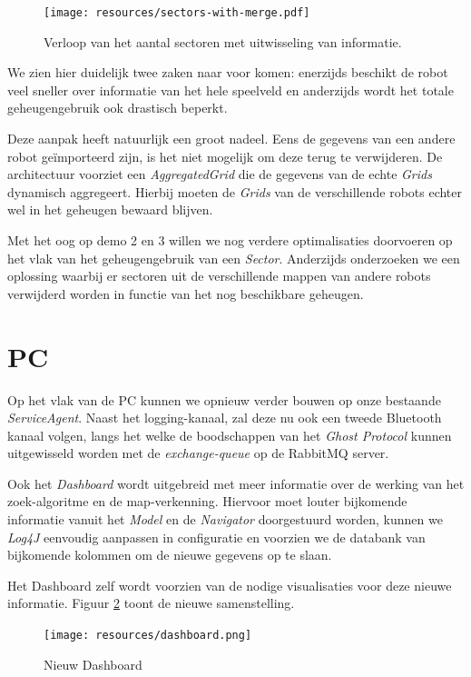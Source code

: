 \documentclass[12pt,a4paper]{report}
\begin{document}
\begin{figure}[htbp]
  \centering
  \texttt{[image: resources/sectors-with-merge.pdf]}
  \caption{Verloop van het aantal sectoren met uitwisseling van informatie.}
  \label{chart:sectors-with-merge}
\end{figure}

We zien hier duidelijk twee zaken naar voor komen: enerzijds beschikt de robot veel sneller over informatie van het hele speelveld en anderzijds wordt het totale geheugengebruik ook drastisch beperkt.

Deze aanpak heeft natuurlijk een groot nadeel. Eens de gegevens van een andere robot ge\"importeerd zijn, is het niet mogelijk om deze terug te verwijderen. De architectuur voorziet een \emph{AggregatedGrid} die de gegevens van de echte \emph{Grids} dynamisch aggregeert. Hierbij moeten de \emph{Grids}  van de verschillende robots echter wel in het geheugen bewaard blijven.

Met het oog op demo 2 en 3 willen we nog verdere optimalisaties doorvoeren op het vlak van het geheugengebruik van een \emph{Sector}. Anderzijds onderzoeken we een oplossing waarbij er sectoren uit de verschillende mappen van andere robots verwijderd worden in functie van het nog beschikbare geheugen.

\section{PC}

Op het vlak van de PC kunnen we opnieuw verder bouwen op onze bestaande \emph{ServiceAgent}. Naast het logging-kanaal, zal deze nu ook een tweede Bluetooth kanaal volgen, langs het welke de boodschappen van het \emph{Ghost Protocol} kunnen uitgewisseld worden met de \emph{exchange-queue} op de RabbitMQ server.

Ook het \emph{Dashboard} wordt uitgebreid met meer informatie over de werking van het zoek-algoritme en de map-verkenning. Hiervoor moet louter bijkomende informatie vanuit het \emph{Model} en de \emph{Navigator} doorgestuurd worden, kunnen we \emph{Log4J} eenvoudig aanpassen in configuratie en voorzien we de databank van bijkomende kolommen om de nieuwe gegevens op te slaan.

Het Dashboard zelf wordt voorzien van de nodige visualisaties voor deze nieuwe informatie. Figuur \ref{fig:dashboard} toont de nieuwe samenstelling.

\begin{figure}[htbp]
  \centering
  \texttt{[image: resources/dashboard.png]}
  \caption{Nieuw Dashboard}
  \label{fig:dashboard}
\end{figure}
\end{document}
